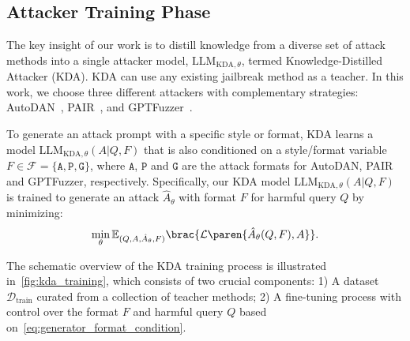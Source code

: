 \subsection{Attacker Training Phase}\label{sec:KDA_training}


The key insight of our work is to distill knowledge from a diverse set of attack methods into a single attacker model, $\text{LLM}_{\text{KDA}, \theta}$, termed  Knowledge-Distilled Attacker (KDA). KDA can use any existing jailbreak method as a  teacher. In this work, we choose three different attackers with complementary strategies: AutoDAN~\citep{liu_autodan_2024}, PAIR~\citep{chao_jailbreaking_2024}, and GPTFuzzer~\citep{yu_gptfuzzer_2024}. 

To generate an attack prompt with a specific style or format, KDA learns a model $\text{LLM}_{\text{KDA}, \theta}(A | Q, F)$ that is also conditioned on a style/format variable $F\in\mathcal{F} = \{\texttt{A}, \texttt{P}, \texttt{G}\}$, where $\texttt{A}$, $\texttt{P}$ and $\texttt{G}$ are the attack formats for AutoDAN, PAIR and GPTFuzzer, respectively. Specifically, our KDA model $\text{LLM}_{\text{KDA}, \theta}(A | Q, F)$ is trained to generate an attack $\hat{A}_{\theta}$ with format $F$ for harmful query $Q$ by minimizing:
\begin{align}\label{eq:generator_format_condition}
    \begin{split}
        \min_{\theta} \mathbb{E}_{(Q, A, \hat{A}_{\theta}, F)}\brac{ \mathcal{L} \paren{\hat{A}_\theta(Q,F), A}}.
    \end{split}
\end{align}
%



The schematic overview of the KDA training process is illustrated in~\autoref{fig:kda_training}, which consists of two crucial components: 1) A dataset $\mathcal{D}_{\text{train}}$ curated from a collection of teacher methods; 2) A fine-tuning process with control over the format $F$ and harmful query $Q$ based on~\autoref{eq:generator_format_condition}.


